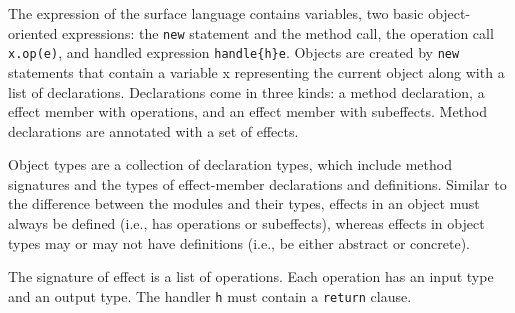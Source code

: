 \documentclass{article}
\begin{document}
The expression of the surface language contains variables, two basic object-oriented expressions: the \texttt{new} statement and the method call, the operation call \texttt{x.op(e)}, and handled expression \texttt{handle\{h\}e}. Objects are created by \texttt{new} statements that contain a variable x representing the current object along with a list of declarations.  Declarations come in three kinds: a method declaration, a effect member with operations, and an effect member with subeffects. Method declarations are annotated with a set of effects.  

Object types are a collection of declaration types, which include method signatures and the types of effect-member declarations and definitions. Similar to the difference between the modules and their types, effects in an object must always be defined (i.e., has operations or subeffects), whereas effects in object types may or may not have definitions (i.e., be either abstract or concrete).

The signature of effect is a list of operations. Each operation has an input type and an output type. The handler \texttt{h} must contain a \texttt{return} clause. 
\end{document}
